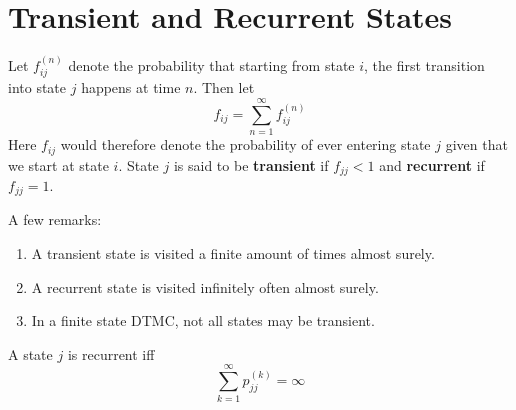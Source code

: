 \documentclass[a4paper,10pt,english]{article}
\begin{document}
\section{Transient and Recurrent States}
\begin{defn}
Let $f_{ij}^{(n)}$ denote the probability that starting from state $i$, the first transition into state $j$ happens at time $n$. Then let
\[f_{ij} = \sum_{n=1}^\infty f_{ij}^{(n)}\]
Here $f_{ij}$ would therefore denote the probability of ever entering state $j$ given that we start at state $i$. State $j$ is said to be \textbf{transient} if $f_{jj} < 1$ and \textbf{recurrent} if $f_{jj}=1$. 
\end{defn}
A few remarks:
\begin{enumerate}
	\item A transient state is visited a finite amount of times almost surely.
	\item A recurrent state is visited infinitely often almost surely.
	\item In a finite state DTMC, not all states may be transient. 
\end{enumerate}
\begin{prop}
A state $j$ is recurrent iff
\[\sum_{k=1}^\infty p_{jj}^{(k)} = \infty\]
\end{prop}
\end{document}
